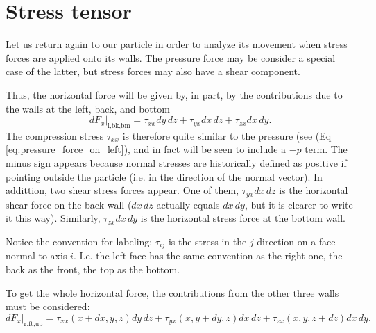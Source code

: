 \section{Stress tensor}

Let us return again to our particle in order to analyze its movement
when stress forces are applied onto its walls. The pressure force may
be consider a special case of the latter, but stress forces may also
have a shear component.

Thus, the horizontal force will be given by, in part, by the
contributions due to the walls at the left, back, and bottom
\begin{equation}
  \label{eq:wall_shear_stress}
  \left. dF_x \right|_\text{l,bk,bm} =
    \tau_{xx} dy\, dz +
    \tau_{yx} dx\, dz +
    \tau_{zx} dx\, dy .
\end{equation}
%
The compression stress $\tau_{xx}$ is therefore quite similar to the
pressure (see (Eq  \ref{eq:pressure_force_on_left}), and in fact
will be seen to include a $-p$ term. The minus sign appears because
normal stresses are historically defined as positive if pointing
outside the particle (i.e. in the direction of the normal vector).
%
In addittion, two shear stress forces appear. One of them, $\tau_{yx}
dx\, dz$ is the horizontal shear force on the back wall ($dx\, dz$
actually equals $dx\, dy$, but it is clearer to write it this
way). Similarly, $\tau_{zx} dx\, dy $ is the horizontal stress force
at the bottom wall.

Notice the convention for labeling: $\tau_{ij}$ is the stress in the
$j$ direction on a face normal to axis $i$. I.e. the left face has the
same convention as the right one, the back as the front, the top as
the bottom.


To get the whole horizontal force, the contributions from the other
three walls must be considered:
\[
\left. dF_x \right|_\text{r,ft,up} =
  \tau_{xx}(x+dx,y   ,z   )  dy\, dz +
  \tau_{yx}(x   ,y+dy,z   )  dx\, dz +
  \tau_{zx}(x   ,y   ,z+dz)  dx\, dy .
\]

